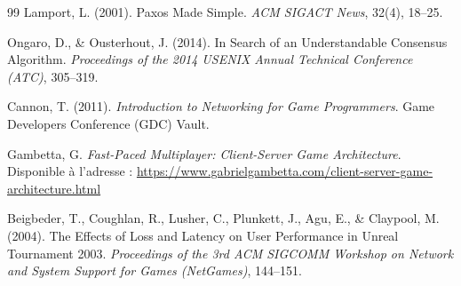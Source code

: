 \documentclass[12pt,a4paper]{article}
\begin{document}
\begin{thebibliography}{99}
Lamport, L. (2001). Paxos Made Simple. \textit{ACM SIGACT News}, 32(4), 18--25.

Ongaro, D., \& Ousterhout, J. (2014). In Search of an Understandable Consensus Algorithm. \textit{Proceedings of the 2014 USENIX Annual Technical Conference (ATC)}, 305--319.

Cannon, T. (2011). \textit{Introduction to Networking for Game Programmers}. Game Developers Conference (GDC) Vault.

Gambetta, G. \textit{Fast-Paced Multiplayer: Client-Server Game Architecture}. Disponible à l'adresse : \url{https://www.gabrielgambetta.com/client-server-game-architecture.html}

Beigbeder, T., Coughlan, R., Lusher, C., Plunkett, J., Agu, E., \& Claypool, M. (2004). The Effects of Loss and Latency on User Performance in Unreal Tournament 2003. \textit{Proceedings of the 3rd ACM SIGCOMM Workshop on Network and System Support for Games (NetGames)}, 144--151.

\end{thebibliography}
\end{document}
